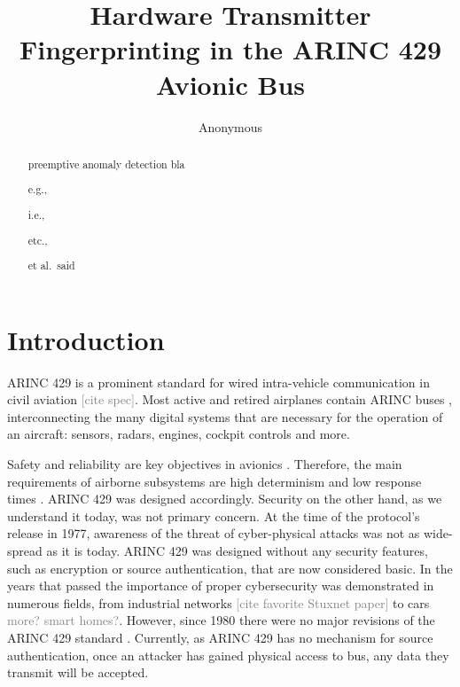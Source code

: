 \documentclass[conference]{IEEEtran}
\title{Hardware Transmitter Fingerprinting in the ARINC 429 Avionic Bus}
\author{Anonymous}
\begin{document}
\maketitle

\begin{abstract}
  preemptive anomaly detection
    bla
    
    e.g., 
    
    i.e.,
    
    etc.,
    
    et al.\ said
    
\end{abstract}


\section{Introduction}
  
  ARINC 429 is a prominent standard for wired intra-vehicle communication in civil aviation \textcolor{gray}{[cite spec]}. Most active and retired airplanes contain ARINC buses \cite{fuchs2012evolution}, interconnecting the many digital systems that are necessary for the operation of an aircraft: sensors, radars, engines, cockpit controls and more.
  
  Safety and reliability are key objectives in avionics \cite{fuchs2012evolution}. Therefore, the main requirements of airborne subsystems are high determinism and low response times \cite{thanthry2005aviation}. ARINC 429 was designed accordingly. Security on the other hand, as we understand it today, was not primary concern. At the time of the protocol's release in 1977, awareness of the threat of cyber-physical attacks was not as wide-spread as it is today. ARINC 429 was designed without any security features, such as encryption or source authentication, that are now considered basic. In the years that passed the importance of proper cybersecurity was demonstrated in numerous fields, from industrial networks \textcolor{gray}{[cite favorite Stuxnet paper]} to cars \cite{miller2015remote} \textcolor{gray}{more? smart homes?}. However, since 1980 there were no major revisions of the ARINC 429 standard \cite{18937420070101}. Currently, as ARINC 429 has no mechanism for source authentication, once an attacker has gained physical access to bus, any data they transmit will be accepted.
  
\end{document}
